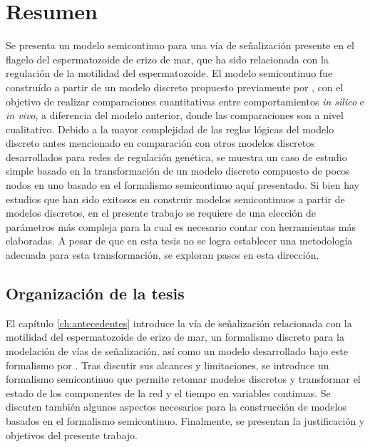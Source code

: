 \begingroup
\let\clearpage\relax
\let\cleardoublepage\relax
\let\cleardoublepage\relax

\chapter*{Resumen}

Se presenta un modelo semicontinuo para una vía de señalización presente en el flagelo del espermatozoide de erizo de mar, que ha sido relacionada con la regulación de la motilidad del espermatozoide. El modelo semicontinuo fue construído a partir de un modelo discreto propuesto previamente por \citeauthor{Espinal2011} \citep{Espinal2011}, con el objetivo de realizar comparaciones cuantitativas entre comportamientos \emph{in silico} e \emph{in vivo}, a diferencia del modelo anterior, donde las comparaciones son a nivel cualitativo. Debido a la mayor complejidad de las reglas lógicas del modelo discreto antes mencionado en comparación con otros modelos discretos desarrollados para redes de regulación genética, se muestra un caso de estudio simple basado en la transformación de un modelo discreto compuesto de pocos nodos en uno basado en el formalismo semicontinuo aquí presentado. Si bien hay estudios que han sido exitosos en construir modelos semicontinuos a partir de modelos discretos, en el presente trabajo se requiere de una elección de parámetros más compleja para la cual es necesario contar con herramientas más elaboradas. A pesar de que en esta tesis no se logra establecer una metodología adecuada para esta transformación, se exploran pasos en esta dirección.

\section*{Organización de la tesis}

El capítulo \ref{ch:antecedentes} introduce la vía de señalización relacionada con la motilidad del espermatozoide de erizo de mar, un formalismo discreto para la modelación de vías de señalización, así como un modelo desarrollado bajo este formalismo por \citeauthor{Espinal2011} \citep{Espinal2011}. Tras discutir sus alcances y limitaciones, se introduce un formalismo semicontinuo que permite retomar modelos discretos y transformar el estado de los componentes de la red y el tiempo en variables continuas. Se discuten también algunos aspectos necesarios para la construcción de modelos basados en el formalismo semicontinuo. Finalmente, se presentan la justificación y objetivos del presente trabajo.

